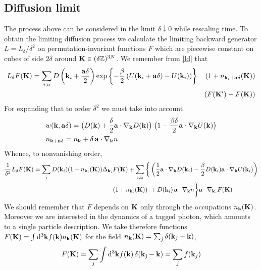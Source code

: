 \documentclass[a4paper,12pt,reqno,superscriptaddress,nofootinbib]{revtex4}
\newcommand{\bbZ}{{\mathbb Z}}
\newcommand{\0}{^{(0)}}
\newcommand{\1}{^{(1)}}
\newcommand{\2}{^{(2)}}
\begin{document}
\subsection{Diffusion limit}


The process above can be considered in the limit $\delta\downarrow 0$ while rescaling time.
To obtain the limiting diffusion process we calculate the limiting backward generator $L = L_\delta/\delta^2$ on permutation-invariant functions $F$ which are piecewise constant on cubes of side $2\delta$ around $\vb{K}\in (\delta\bbZ)^{3N}$.   We remember from \eqref{ld} that
\begin{eqnarray}
L_\delta F(\vb{K}) = \sum_{i,a} D\left( \vb{k}_i + \frac{\vb{a} \delta}{2} \right) 
\exp\left\{-\frac{\beta}{2}\left(U(\vb{k}_i + \vb{a} \delta) - 
U(\vb{k}_i)\right)\right\}&&(1+ n_{\vb{k}_i+ \vb{a}\delta}(\vb{K}))\nonumber\\
&&\left(F(\vb{K}') 
-F(\vb{K})\right)
\end{eqnarray}
For expanding that to order $\delta^2$ we must take into account
\begin{align*}
&w(\vb{k},\vb{a}\delta) = \big(D(\vb{k}) + \frac{ \delta}{2}\vb{a}\cdot 
\nabla_{\vb{k}} D (\vb{k})\big)\;\big(1-\frac{\beta\delta}{2}\vb{a}\cdot 
\nabla_{\vb{k}} U (\vb{k})\big) \\
&n_{\vb{k+a\delta}} = n_{\vb{k}} +  \delta\,\vb{a}\cdot \nabla_{\vb{k}} n
\end{align*}
Whence, to nonvanishing order,
\begin{align}
\frac 1{\delta^2}L_\delta F(\vb{K}) = \sum_{i}D(\vb{k}_i)(1+ 
n_{\vb{k}_i}(\vb{K}))\Delta_{\vb{k}_i}&F(\vb{K})+\sum_{i,\vb{a}}\bigg{\{}\left(\frac{1}{2}\vb{a}\cdot \nabla_{\vb{k}} D (\vb{k}_i) 
-\frac{\beta}{2}D(\vb{k}_i)\vb{a}\cdot \nabla_{\vb{k}} U 
(\vb{k}_i)\right)\nonumber\\
&(1+n_{\vb{k}_i}(\vb{K}))\
+ D(\vb{k}_i) \,\vb{a}\cdot 
\nabla_{\vb{k}} n\bigg{\}}\vb{a}\cdot\nabla_{\vb{k}_i}F(\vb{K})\label{2o}
\end{align}
We should remember that $F$ depends on $\vb{K}$ only through the occupations $n_{\vb{k}}(\vb{K})$.
Moreover we are interested in the dynamics of a tagged photon, which amounts to 
a single particle description.  We take therefore functions $F(\vb{K}) = 
\int\dd^3\vb{k} f(\vb{k}) n_{\vb{k}}(\vb{K})$ for the field $n_{\vb{k}}(\vb{K}) 
= \sum_j \delta(\vb{k}_j-\vb{k}) $,
\begin{equation}\label{sumj}
F(\vb{K}) =
\sum_j \int\dd^3\vb{k} f(\vb{k}) \, \delta(\vb{k_j}-\vb{k}) = \sum_j f({\vb{k}_j})
\end{equation}
\end{document}
